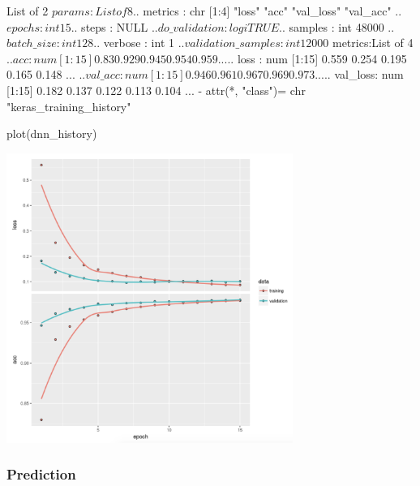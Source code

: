 \documentclass[
  12pt,
]{krantz}
\makeatletter
\newenvironment{Shaded}{\begin{snugshade}}{\end{snugshade}}
\newcommand{\FunctionTok}[1]{\textcolor[rgb]{0,0,0}{#1}}
\newcommand{\NormalTok}[1]{#1}
\newenvironment{kframe}{%
\medskip{}
\setlength{\fboxsep}{.8em}
 \def\at@end@of@kframe{}%
 \ifinner\ifhmode%
  \def\at@end@of@kframe{\end{minipage}}%
  \begin{minipage}{\columnwidth}%
 \fi\fi%
 \def\FrameCommand##1{\hskip\@totalleftmargin \hskip-\fboxsep
 \colorbox{shadecolor}{##1}\hskip-\fboxsep
     \hskip-\linewidth \hskip-\@totalleftmargin \hskip\columnwidth}%
 \MakeFramed {\advance\hsize-\width
   \@totalleftmargin\z@ \linewidth\hsize
   \@setminipage}}%
 {\par\unskip\endMakeFramed%
 \at@end@of@kframe}
\renewenvironment{Shaded}{\begin{kframe}}{\end{kframe}}
\makeatother
\begin{document}
\begin{Shaded}
\begin{Highlighting}[]
\NormalTok{List of 2}
\NormalTok{ $ params :List of 8}
\NormalTok{  ..$ metrics           : chr [1:4] "loss" "acc" "val\_loss" "val\_acc"}
\NormalTok{  ..$ epochs            : int 15}
\NormalTok{  ..$ steps             : NULL}
\NormalTok{  ..$ do\_validation     : logi TRUE}
\NormalTok{  ..$ samples           : int 48000}
\NormalTok{  ..$ batch\_size        : int 128}
\NormalTok{  ..$ verbose           : int 1}
\NormalTok{  ..$ validation\_samples: int 12000}
\NormalTok{ $ metrics:List of 4}
\NormalTok{  ..$ acc     : num [1:15] 0.83 0.929 0.945 0.954 0.959 ...}
\NormalTok{  ..$ loss    : num [1:15] 0.559 0.254 0.195 0.165 0.148 ...}
\NormalTok{  ..$ val\_acc : num [1:15] 0.946 0.961 0.967 0.969 0.973 ...}
\NormalTok{  ..$ val\_loss: num [1:15] 0.182 0.137 0.122 0.113 0.104 ...}
\NormalTok{ {-} attr(*, "class")= chr "keras\_training\_history"}
\end{Highlighting}
\end{Shaded}

\begin{Shaded}
\begin{Highlighting}[]
\FunctionTok{plot}\NormalTok{(dnn\_history)}
\end{Highlighting}
\end{Shaded}

\includegraphics[width=0.7\textwidth,height=\textheight]{images/dnn_history.png}

\hypertarget{prediction}{%
\subsubsection{Prediction}\label{prediction}}
\end{document}
